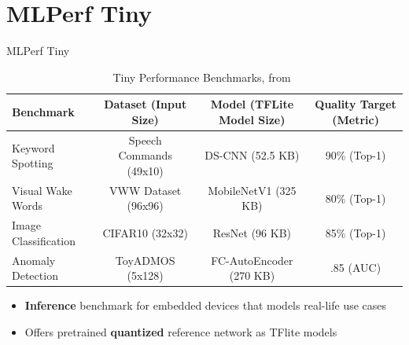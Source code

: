 \section{MLPerf Tiny}
\begin{frame}{MLPerf Tiny}
\begin{table}[ht]
\centering
\caption{Tiny Performance Benchmarks, from~\parencite{tinyperf}}
\begin{adjustbox}{max width=\textwidth}
\begin{tabular}{lccc}
  \toprule
  \textbf{Benchmark} & \textbf{Dataset (Input Size)} & \textbf{Model (TFLite Model Size)} & \textbf{Quality Target (Metric)} \\
  \midrule
  Keyword Spotting & Speech Commands (49x10) & DS-CNN (52.5 KB) & 90\% (Top-1) \\
  Visual Wake Words & VWW Dataset (96x96)  & MobileNetV1 (325 KB) & 80\% (Top-1) \\
  Image Classification & CIFAR10 (32x32) & ResNet (96 KB) & 85\% (Top-1) \\
  Anomaly Detection & ToyADMOS (5x128)  & FC-AutoEncoder (270 KB) & .85 (AUC) \\
  \bottomrule
\end{tabular}
\end{adjustbox}
\label{tab:tinyperf}
\end{table}
\begin{itemize}
        \centering
        \item \textbf{Inference} benchmark for embedded devices that models real-life use cases
        \item Offers pretrained \textbf{quantized} reference network as TFlite models
\end{itemize}
\end{frame}

